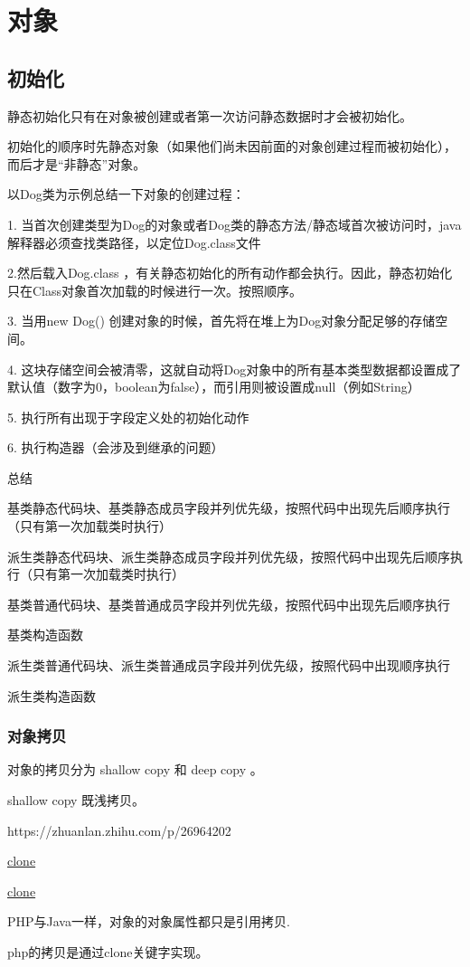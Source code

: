 \chapter{对象}

\label{chap:object}

\section{初始化}


静态初始化只有在对象被创建或者第一次访问静态数据时才会被初始化。

初始化的顺序时先静态对象（如果他们尚未因前面的对象创建过程而被初始化），而后才是“非静态”对象。

以Dog类为示例总结一下对象的创建过程：

1. 当首次创建类型为Dog的对象或者Dog类的静态方法/静态域首次被访问时，java解释器必须查找类路径，以定位Dog.class文件

2.然后载入Dog.class ，有关静态初始化的所有动作都会执行。因此，静态初始化只在Class对象首次加载的时候进行一次。按照顺序。

3. 当用new Dog() 创建对象的时候，首先将在堆上为Dog对象分配足够的存储空间。

4. 这块存储空间会被清零，这就自动将Dog对象中的所有基本类型数据都设置成了默认值（数字为0，boolean为false），而引用则被设置成null（例如String）

5. 执行所有出现于字段定义处的初始化动作

6. 执行构造器（会涉及到继承的问题）


总结


基类静态代码块、基类静态成员字段并列优先级，按照代码中出现先后顺序执行（只有第一次加载类时执行）

派生类静态代码块、派生类静态成员字段并列优先级，按照代码中出现先后顺序执行（只有第一次加载类时执行）

基类普通代码块、基类普通成员字段并列优先级，按照代码中出现先后顺序执行

基类构造函数

派生类普通代码块、派生类普通成员字段并列优先级，按照代码中出现顺序执行

派生类构造函数

\subsection{对象拷贝}

对象的拷贝分为 shallow copy 和 deep copy 。

shallow copy 既浅拷贝。




https://zhuanlan.zhihu.com/p/26964202

\href{https://zgxxx.github.io/2019/02/27/20190227/}{clone}

\href{https://howtodoinjava.com/java/cloning/a-guide-to-object-cloning-in-java/}{clone}

PHP与Java一样，对象的对象属性都只是引用拷贝.

php的拷贝是通过clone关键字实现。





